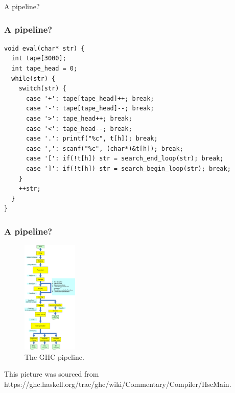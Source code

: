 \documentclass[aspectratio=169]{beamer}
\begin{document}
  \begin{frame}{A pipeline?}
  \end{frame}
  \begin{frame}[fragile]
    \frametitle{A pipeline?}
    \begin{listing}[H]
      \caption{A silly Brainfuck VM}
      \begin{verbatim}
void eval(char* str) {
  int tape[3000];
  int tape_head = 0;
  while(str) {
    switch(str) {
      case '+': tape[tape_head]++; break;
      case '-': tape[tape_head]--; break;
      case '>': tape_head++; break;
      case '<': tape_head--; break;
      case '.': printf("%c", t[h]); break;
      case ',': scanf("%c", (char*)&t[h]); break;
      case '[': if(!t[h]) str = search_end_loop(str); break;
      case ']': if(!t[h]) str = search_begin_loop(str); break;
    }
    ++str;
  }
}
      \end{verbatim}
    \end{listing}
  \end{frame}
  \begin{frame}[fragile]
    \frametitle{A pipeline?}
    \begin{figure}
      \includegraphics[height=5.4cm]{ghc_pipeline.png}
      \caption{The GHC pipeline.}
    \end{figure}
    \scriptsize This picture was sourced from https://ghc.haskell.org/trac/ghc/wiki/Commentary/Compiler/HscMain.
  \end{frame}
\end{document}
